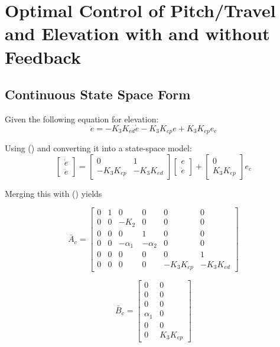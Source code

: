 
\section{Optimal Control of Pitch/Travel and Elevation with and without Feedback}
\subsection{Continuous State Space Form}
Given the following equation for elevation:
\begin{equation}\label{eq:elevation}
\ddot{e} = -K_3K_{ed}\dot{e} - K_3K_{ep}e +K_3K_{ep}e_c
\end{equation}

Using () and converting it into a state-space model:
$$
\begin{bmatrix}
\dot{e} \\
\ddot{e}
\end{bmatrix} = \begin{bmatrix}
0 & 1 \\
-K_3K_{ep} & -K_3K_{ed}
\end{bmatrix}\begin{bmatrix}
e \\
\dot{e}
\end{bmatrix}
+\begin{bmatrix}
0 \\
K_3K_{ep}
\end{bmatrix}e_c
$$

Merging this with () yields

\begin{equation}
\bar{A}_c =
\begin{bmatrix}
    0 & 1 & 0 & 0 & 0 & 0 \\
    0 & 0 & -K_2 & 0 & 0 & 0 \\
    0 & 0 & 0 & 1 & 0 & 0 \\
    0 & 0 & -\alpha_1 & - \alpha_2 & 0 & 0 \\
    0 & 0 & 0 & 0 & 0 & 1 \\
    0 & 0 & 0 & 0 & -K_3K_{ep} & -K_3K_{ed}
\end{bmatrix}
\end{equation}

\begin{equation}
\bar{B}_c =
\begin{bmatrix}
    0 & 0\\
    0 & 0 \\
    0 & 0 \\
    \alpha_1 & 0 \\
    0 & 0 \\
    0 & K_3K_{ep}
\end{bmatrix}
\end{equation}

